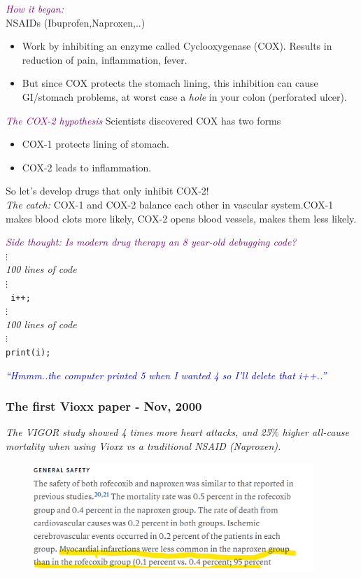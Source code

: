 \documentclass[shadesubsections,compress,14pt,mathserif]{beamer}
\newcommand{\nl}{\\ \pause \vspace{0.2in}}
\newcommand{\nlnp}{\\ \vspace{0.2in}}
\newcommand{\stitle}[1]{{\large{\textcolor{purple}{\emph{#1}}}}}
\begin{document}
\begin{frame}
 \stitle{How it began:}\\
 NSAIDs (Ibuprofen,Naproxen,..)
 \begin{itemize}
  \item 
 Work by inhibiting an enzyme called Cyclooxygenase (COX). Results in reduction of pain, inflammation, fever.\nl
 \item But since COX protects the stomach lining, this inhibition can cause GI/stomach problems, at worst case a \emph{hole} in your colon (perforated ulcer).
 \end{itemize}

 
\end{frame}
\begin{frame}
 \stitle{The COX-2 hypothesis}
 Scientists discovered COX has two forms
 \begin{itemize}
  \item COX-1 protects lining of stomach.
  \item COX-2 leads to inflammation.\nl
 \end{itemize}
So let's develop drugs that only inhibit COX-2!\nl
\emph{The catch:} COX-1 and COX-2 balance each other in vascular system.COX-1 makes blood clots more likely, COX-2 opens blood vessels, makes them less likely.
\end{frame}
\begin{frame}
 \stitle{Side thought: Is modern drug therapy an 8 year-old debugging code?}\\
 $\vdots$\\
 \emph{100 lines of code}\\
 $\vdots$\\
\texttt{ i++;}\\
 $\vdots$\\
 \emph{100 lines of code\\}
 $\vdots$\\
\texttt{print(i);}\nlnp
 
 \emph{\textcolor{blue}{``Hmmm..the computer printed 5 when I wanted 4 so I'll delete that i++..''}}
\end{frame}
\begin{frame}
 \frametitle{The first Vioxx paper - Nov, 2000}
 \emph{The VIGOR study showed 4 times more heart attacks, and 25$\%$ higher all-cause mortality when
 using Vioxx vs a traditional NSAID (Naproxen).}
 \begin{figure}
  \includegraphics[width=300pt]{vioxxfirstsafety.png}
\end{figure}
\end{frame}
\end{document}
